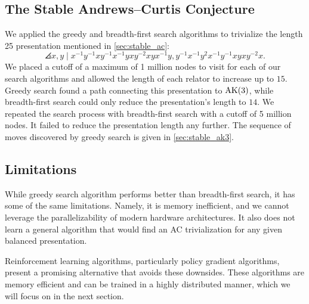 \subsection{The Stable Andrews--Curtis Conjecture}

We applied the greedy and breadth-first search algorithms to trivialize the length 25 presentation mentioned in \autoref{sec:stable_ac}:
\[
\angles{ x, y \mid
	x^{-1}y^{-1}xy^{-1}x^{-1}yxy^{-2}xyx^{-1}y,
	y^{-1}x^{-1}y^2x^{-1}y^{-1}xyxy^{-2}x }.
\]
We placed a cutoff of a maximum of 1 million nodes to visit for each of our search algorithms and allowed the length of each relator to increase up to $15$.
Greedy search found a path connecting this presentation to $\text{AK}(3)$, while breadth-first search could only reduce the presentation's length to $14$.
We repeated the search process with breadth-first search with a cutoff of 5 million nodes.
It failed to reduce the presentation length any further.
The sequence of moves discovered by greedy search is given in \autoref{sec:stable_ak3}.

\subsection{Limitations}

While greedy search algorithm performs better than breadth-first search, it has some of the same limitations.
Namely, it is memory inefficient, and we cannot leverage the parallelizability of modern hardware architectures.
It also does not learn a general algorithm that would find an AC trivialization for any given balanced presentation.

Reinforcement learning algorithms, particularly policy gradient algorithms, present a promising alternative that avoids these downsides.
These algorithms are memory efficient and can be trained in a highly distributed manner, which we will focus on in the next section.